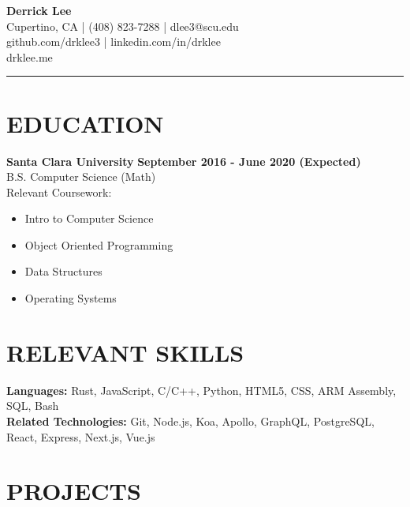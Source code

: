 \documentclass{res}
\begin{document}
	\thispagestyle{empty} %
	\begin{multicols}{2}
		\vfill\null
		{\bf \huge{Derrick Lee}} \\
		
		\hspace*{\fill} {Cupertino, CA | (408) 823-7288 | dlee3@scu.edu} \\
		\hspace*{\fill} {github.com/drklee3 | linkedin.com/in/drklee} \\
		\hspace*{\fill} {drklee.me} \\
	\end{multicols}
	\vspace{-10mm}
	\noindent\rule{\textwidth}{1pt}
	
	\begin{resume}

		\section{EDUCATION}

		{\bf Santa Clara University} \hfill {\bf September 2016 - June 2020 (Expected)} \\
			B.S. Computer Science (Math) \\
			Relevant Coursework:
			\vspace{-3.5mm}
			\begin{multicols}{2}
			\begin{itemize} \itemsep -2pt
				\item Intro to Computer Science
				\item Object Oriented Programming
				\item Data Structures
				\item Operating Systems
			\end{itemize}
			\end{multicols}
		
		\section{RELEVANT SKILLS}
		\vspace{6pt}

			{\bf Languages:} Rust, JavaScript, C/C++, Python, HTML5, CSS, ARM Assembly, SQL, Bash \\
			{\bf Related Technologies:} Git, Node.js, Koa, Apollo, GraphQL, PostgreSQL, React, Express, Next.js, Vue.js

		\section{PROJECTS}
		\vspace{6pt}


\end{resume}
\end{document}

